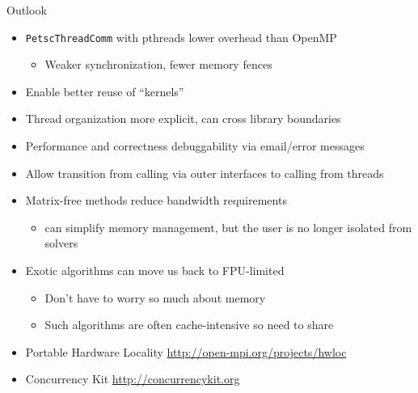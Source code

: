 \documentclass{beamer}
\begin{document}
\begin{frame}{Outlook}
  \begin{itemize}
  \item \texttt{PetscThreadComm} with pthreads lower overhead than OpenMP
    \begin{itemize}
    \item Weaker synchronization, fewer memory fences
    \end{itemize}
  \item Enable better reuse of ``kernels''
  \item Thread organization more explicit, can cross library boundaries
  \item Performance and correctness debuggability via email/error messages
  \item Allow transition from calling via outer interfaces to calling from threads
  \item Matrix-free methods reduce bandwidth requirements
    \begin{itemize}
    \item can simplify memory management, but the user is no longer isolated from solvers
    \end{itemize}
  \item Exotic algorithms can move us back to FPU-limited
    \begin{itemize}
    \item Don't have to worry so much about memory
    \item Such algorithms are often cache-intensive so need to share
    \end{itemize}
  \item Portable Hardware Locality \url{http://open-mpi.org/projects/hwloc}
  \item Concurrency Kit \url{http://concurrencykit.org}
  \end{itemize}
\end{frame}
\end{document}
